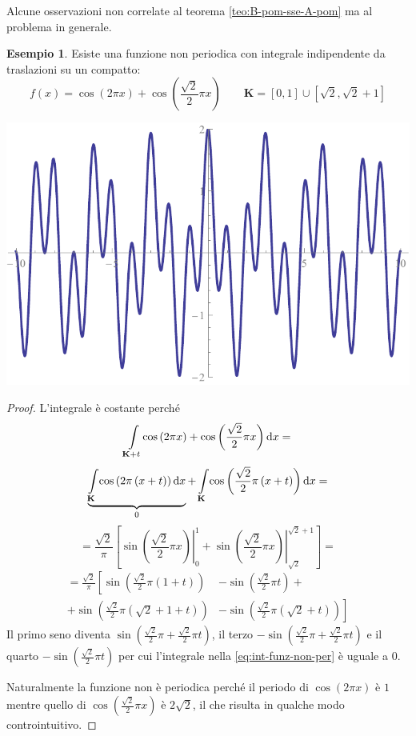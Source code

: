 \documentclass[12pt]{article}
\newcommand\ins[1]{\mathbf #1}
\newcommand\intes[2]{\int\limits_{#1}\!#2\text dx}
\theoremstyle{definition}
\newtheorem{esem}{Esempio}
\begin{document}
Alcune osservazioni non correlate al teorema \ref{teo:B-pom-sse-A-pom} ma al problema in generale.
\begin{esem}Esiste una funzione non periodica con integrale indipendente da traslazioni su un compatto:
\begin{equation*}
f(x)=\cos\left(2\pi x\right)+\cos\left(\frac{\sqrt2}2\pi x\right)\qquad\ins K=\left[0,1\right]\cup\left[\sqrt2,\sqrt2+1\right]
\end{equation*}
\end{esem}
\begin{center}
\includegraphics*[scale=0.8]{ex4.pdf}
\end{center}
\begin{proof}L'integrale è costante perché
\begin{equation}\label{eq:int-funz-non-per}
\intes{\ins K+t}{\cos\left(2\pi x\right)+\cos\left(\frac{\sqrt2}2\pi x\right)}=
\end{equation}
\begin{equation*}
\underbrace{\intes{\ins K}{\cos\left(2\pi\left(x+t\right)\right)}}_0+\intes{\ins K}{\cos\left(\frac{\sqrt2}2\pi\left(x+t\right)\right)}=
\end{equation*}
\begin{equation*}
=\frac{\sqrt2}\pi\left[\left.\sin\left(\frac{\sqrt2}2\pi x\right)\right|_0^1+\left.\sin\left(\frac{\sqrt2}2\pi x\right)\right|_{\sqrt2}^{\sqrt2+1}\right]=
\end{equation*}
\begin{equation*}\begin{split}
=\frac{\sqrt2}\pi\left[\sin\left(\frac{\sqrt2}2\pi\left(1+t\right)\right)\right.&
-\sin\left(\frac{\sqrt2}2\pi t\right)+\\
+\sin\left(\frac{\sqrt2}2\pi\left(\sqrt2+1+t\right)\right)&
\left.-\sin\left(\frac{\sqrt2}2\pi\left(\sqrt2+t\right)\right)\right]
\end{split}\end{equation*}
Il primo seno diventa $\sin\left(\frac{\sqrt2}2\pi+\frac{\sqrt2}2\pi t\right)$, il terzo $-\sin\left(\frac{\sqrt2}2\pi+\frac{\sqrt2}2\pi t\right)$ e il quarto $-\sin\left(\frac{\sqrt2}2\pi t\right)$ per cui l'integrale nella \eqref{eq:int-funz-non-per} è uguale a $0$.
 
Naturalmente la funzione non è periodica perché il periodo di $\cos(2\pi x)$ è $1$ mentre quello di $\cos\left(\frac{\sqrt2}2\pi x\right)$ è $2\sqrt2$, il che risulta in qualche modo controintuitivo.
\end{proof}
\end{document}
